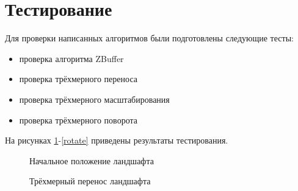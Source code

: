 \section{Тестирование}
Для проверки написанных алгоритмов были подготовлены следующие тесты:
\begin{itemize}
	\item проверка алгоритма ZBuffer
	\item проверка трёхмерного переноса
	\item проверка трёхмерного масштабирования
	\item проверка трёхмерного поворота
\end{itemize}

На рисунках \ref{start}-\ref{rotate} приведены результаты тестирования.

\begin{figure}[h]
	\caption{Начальное положение ландшафта}
	\label{start}
\end{figure}

\begin{figure}
	\caption{Трёхмерный перенос ландшафта}
	\label{move}
\end{figure}

